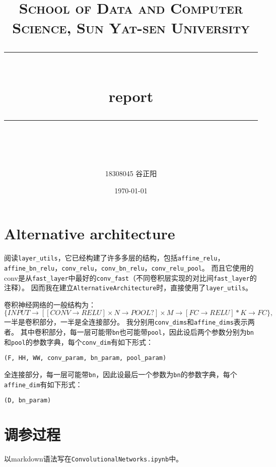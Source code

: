 \documentclass[UTF8, a4paper, 11pt]{article}
\title{	
\normalfont \normalsize
\textsc{School of Data and Computer Science, Sun Yat-sen University} \\ [25pt] %
\rule{\textwidth}{0.5pt} \\[0.4cm] %
\huge report\\ %
\rule{\textwidth}{2pt} \\[0.5cm] %
\author{18308045 谷正阳}
\date{\normalsize\today}
}
\begin{document}
\maketitle
\tableofcontents
\newpage
\section{Alternative architecture}
阅读\texttt{layer\_utils}，它已经构建了许多多层的结构，包括\texttt{affine\_relu}，\texttt{affine\_bn\_relu}，\texttt{conv\_relu}，\texttt{conv\_bn\_relu}，\texttt{conv\_relu\_pool}。
而且它使用的conv是从\texttt{fast\_layer}中最好的\texttt{conv\_fast}（不同卷积层实现的对比间\texttt{fast\_layer}的注释）。
因而我在建立\texttt{AlternativeArchitecture}时，直接使用了\texttt{layer\_utils}。

卷积神经网络的一般结构为：
\begin{equation*}
	\{INPUT\rightarrow[[CONV\rightarrow RELU]\times N\rightarrow POOL?]\times M\rightarrow[FC\rightarrow RELU]*K\rightarrow FC\},
\end{equation*}
一半是卷积部分，一半是全连接部分。
我分别用\texttt{conv\_dims}和\texttt{affine\_dims}表示两者。
其中卷积部分，每一层可能带\texttt{bn}也可能带\texttt{pool}，因此设后两个参数分别为\texttt{bn}和\texttt{pool}的参数字典，每个\texttt{conv\_dim}有如下形式：
\begin{lstlisting}
(F, HH, WW, conv_param, bn_param, pool_param)
\end{lstlisting}
全连接部分，每一层可能带\texttt{bn}，因此设最后一个参数为\texttt{bn}的参数字典，每个\texttt{affine\_dim}有如下形式：
\begin{lstlisting}
(D, bn_param)
\end{lstlisting}
\section{调参过程}
以markdown语法写在\texttt{ConvolutionalNetworks.ipynb}中。
%
%
\end{document}
